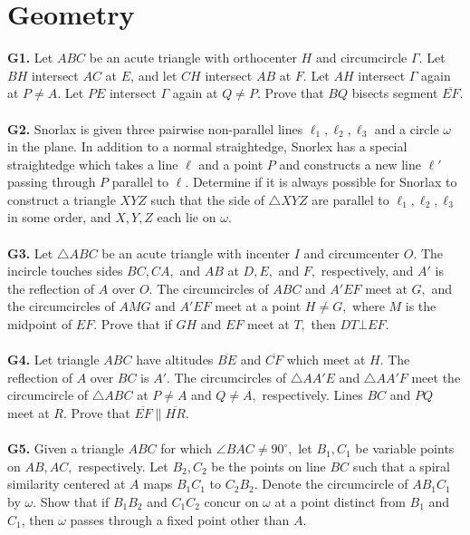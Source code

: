 \documentclass[12pt,a4paper]{article}
\begin{document}
\section*{Geometry}
\textbf{G1.} Let \(ABC\) be an acute triangle with orthocenter \(H\) and circumcircle \(\Gamma\). Let \(BH\) intersect \(AC\) at \(E\), and let \(CH\) intersect \(AB\) at \(F.\) Let \(AH\) intersect \(\Gamma\) again at \(P \ne A.\) Let \(PE\) intersect \(\Gamma\) again at \(Q \ne P.\) Prove that \(BQ\) bisects segment \(\overline{EF}.\)\\
\\
\textbf{G2.} Snorlax is given three pairwise non-parallel lines \({\ell _1},{\ell _2},{\ell _3}\) and a circle \(\omega\) in the plane. In addition to a normal straightedge, Snorlex has a special straightedge which takes a line \(\ell\) and a point \(P\) and constructs a new line \(\ell '\) passing through \(P\) parallel to \(\ell.\) Determine if it is always possible for Snorlax to construct a triangle \(XYZ\) such that the side of \(\bigtriangleup XYZ\) are parallel to \({\ell _1},{\ell _2},{\ell _3}\) in some order, and \(X, Y, Z\) each lie on \(\omega.\)\\
\\
\textbf{G3.} Let \(\bigtriangleup ABC\) be an acute triangle with incenter \(I\) and circumcenter \(O.\) The incircle touches sides \(BC, CA,\) and \(AB\) at \(D, E,\) and \(F,\) respectively, and \(A'\) is the reflection of \(A\) over \(O.\) The circumcircles of \(ABC\) and \(A'EF\) meet at \(G,\) and the circumcircles of \(AMG\) and \(A'EF\) meet at a point \(H \ne G,\) where \(M\) is the midpoint of \(EF.\) Prove that if \(GH\) and \(EF\) meet at \(T,\) then \(DT \bot EF.\)\\
\\
\textbf{G4.} Let triangle \(ABC\) have altitudes \(\overline{BE}\) and \(\overline{CF}\) which meet at \(H.\) The reflection of \(A\) over \(BC\) is \(A'.\) The circumcircles of \(\bigtriangleup AA'E\) and \(\bigtriangleup AA'F\) meet the circumcircle of \(\bigtriangleup ABC\) at \(P \ne A\) and \(Q \ne A,\) respectively. Lines \(BC\) and \(PQ\) meet at \(R.\) Prove that \(\overline {EF} \parallel \overline {HR} .\)\\
\\
\textbf{G5.} Given a triangle \(ABC\) for which \(\angle BAC \ne {90^ \circ},\) let \({B_1}, {C_1}\) be variable points on \(AB, AC,\) respectively. Let \({B_2}, {C_2}\) be the points on line \(BC\) such that a spiral similarity centered at \(A\) maps \({B_1}{C_1}\) to \({C_2}{B_2}.\) Denote the circumcircle of \(A{B_1}{C_1}\) by \(\omega.\) Show that if \({B_1}{B_2}\) and \({C_1}{C_2}\) concur on \(\omega\) at a point distinct from \(B_1\) and \(C_1\), then \(\omega\) passes through a fixed point other than \(A.\)\\
\end{document}
